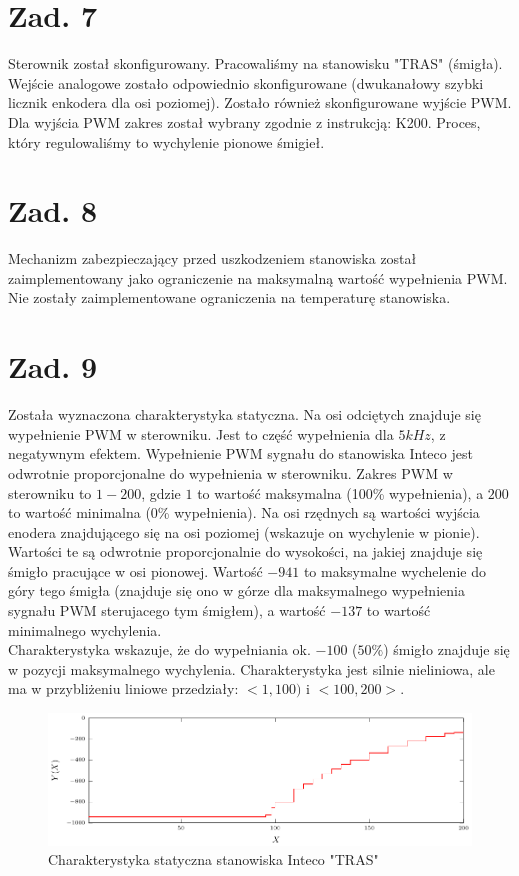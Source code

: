 \documentclass[a4paper,titlepage,11pt,twosides,floatssmall]{mwrep}
\begin{document}
\chapter{Zad. 7}

Sterownik został skonfigurowany. Pracowaliśmy na stanowisku "TRAS" (śmigła). Wejście analogowe zostało odpowiednio skonfigurowane (dwukanałowy szybki licznik enkodera dla osi poziomej). Zostało również skonfigurowane wyjście PWM. Dla wyjścia PWM zakres został wybrany zgodnie z instrukcją: K200. Proces, który regulowaliśmy to wychylenie pionowe śmigieł.

\begingroup
\renewcommand{\cleardoublepage}{}
\renewcommand{\clearpage}{}

\chapter{Zad. 8}

Mechanizm zabezpieczający przed uszkodzeniem stanowiska został zaimplementowany jako ograniczenie na maksymalną wartość wypełnienia PWM. Nie zostały zaimplementowane ograniczenia na temperaturę stanowiska.


\chapter{Zad. 9}

Została wyznaczona charakterystyka statyczna. Na osi odciętych znajduje się wypełnienie PWM w sterowniku. Jest to część wypełnienia dla $5 kHz$, z negatywnym efektem. Wypełnienie PWM sygnału do stanowiska Inteco jest odwrotnie proporcjonalne do wypełnienia w sterowniku. Zakres PWM w sterowniku to $1 - 200$, gdzie $1$ to wartość maksymalna (100\% wypełnienia), a $200$ to wartość minimalna (0\% wypełnienia). Na osi rzędnych są wartości wyjścia enodera znajdującego się na osi poziomej (wskazuje on wychylenie w pionie). Wartości te są odwrotnie proporcjonalnie do wysokości, na jakiej znajduje się śmigło pracujące w osi pionowej. Wartość $-941$ to maksymalne wychelenie do góry tego śmigła (znajduje się ono w górze dla maksymalnego wypełnienia sygnału PWM sterujacego tym śmigłem), a wartość $-137$ to wartość minimalnego wychylenia.\\
Charakterystyka wskazuje, że do wypełniania ok. $-100$ ($50\%$) śmigło znajduje się w pozycji maksymalnego wychylenia. Charakterystyka jest silnie nieliniowa, ale ma w przybliżeniu liniowe przedziały: $<1,100)$ i $<100,200>$.


\begin{figure}[]
	\centering
	\includegraphics[scale=1]{../wykresy/zad9_chst.pdf}
	\caption{Charakterystyka statyczna stanowiska Inteco "TRAS"}
	\label{zad9_chst}
\end{figure}
\end{document}
